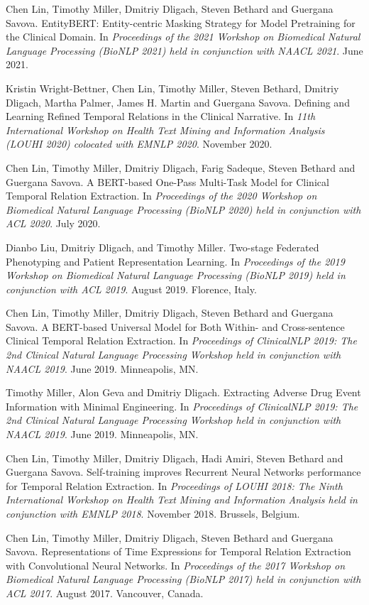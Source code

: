 \documentclass[letterpaper]{article}
\renewenvironment{itemize}{
  \begin{list}{}{
    \setlength{\leftmargin}{1.5em}
  }
}{
  \end{list}
}
\begin{document}
\begin{itemize}
\item Chen Lin, Timothy Miller, Dmitriy Dligach, Steven Bethard and Guergana Savova. EntityBERT: Entity-centric Masking Strategy for Model Pretraining for the Clinical Domain. In \emph{Proceedings of the 2021 Workshop on Biomedical Natural Language Processing (BioNLP 2021) held in conjunction with NAACL 2021}. June 2021.
\item Kristin Wright-Bettner, Chen Lin, Timothy Miller, Steven Bethard, Dmitriy Dligach, Martha Palmer, James H. Martin and Guergana Savova. Defining and Learning Refined Temporal Relations in the Clinical Narrative. In \emph{11th International Workshop on Health Text Mining and Information Analysis (LOUHI 2020) colocated with EMNLP 2020}. November 2020.
\item Chen Lin, Timothy Miller, Dmitriy Dligach, Farig Sadeque, Steven Bethard and Guergana Savova. A BERT-based One-Pass Multi-Task Model for Clinical Temporal Relation Extraction. In \emph{Proceedings of the 2020 Workshop on Biomedical Natural Language Processing (BioNLP 2020) held in conjunction with ACL 2020}. July 2020.
\item Dianbo Liu, Dmitriy Dligach, and Timothy Miller. Two-stage Federated Phenotyping and Patient Representation Learning. In \emph{Proceedings of the 2019 Workshop on Biomedical Natural Language Processing (BioNLP 2019) held in conjunction with ACL 2019}. August 2019. Florence, Italy.
\item Chen Lin, Timothy Miller, Dmitriy Dligach, Steven Bethard and Guergana Savova. A BERT-based Universal Model for Both Within- and Cross-sentence Clinical Temporal Relation Extraction. In \emph{Proceedings of ClinicalNLP 2019: The 2nd Clinical Natural Language Processing Workshop held in conjunction with NAACL 2019}. June 2019. Minneapolis, MN.
\item Timothy Miller, Alon Geva and Dmitriy Dligach. Extracting Adverse Drug Event Information with Minimal Engineering. In \emph{Proceedings of ClinicalNLP 2019: The 2nd Clinical Natural Language Processing Workshop held in conjunction with NAACL 2019}. June 2019. Minneapolis, MN.
\item Chen Lin, Timothy Miller, Dmitriy Dligach, Hadi Amiri, Steven Bethard and Guergana Savova. Self-training improves Recurrent Neural Networks performance for Temporal Relation Extraction. In \emph{Proceedings of LOUHI 2018: The Ninth International Workshop on Health Text Mining and Information Analysis held in conjunction with EMNLP 2018}. November 2018. Brussels, Belgium.
\item Chen Lin, Timothy Miller, Dmitriy Dligach, Steven Bethard and Guergana Savova. Representations of Time Expressions for Temporal Relation Extraction with Convolutional Neural Networks. In \emph{Proceedings of the 2017 Workshop on Biomedical Natural Language Processing (BioNLP 2017) held in conjunction with ACL 2017}. August 2017. Vancouver, Canada.

\end{itemize}
\end{document}
